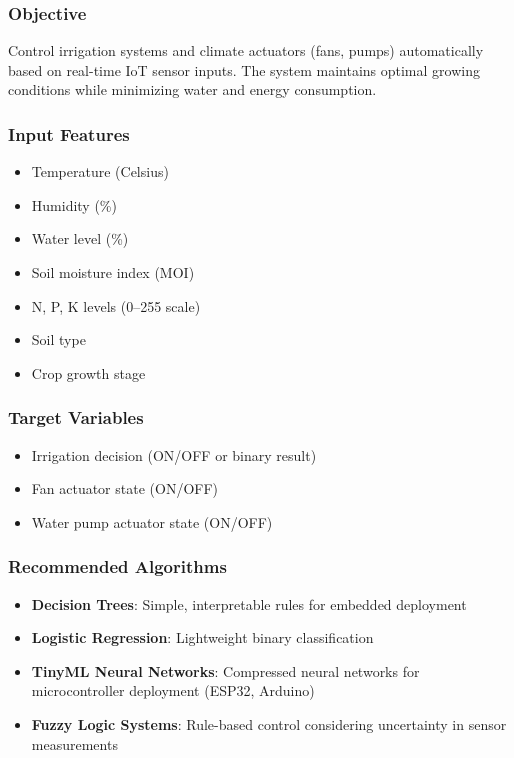 \documentclass[conference]{IEEEtran}
\begin{document}
\subsubsection{Objective}
Control irrigation systems and climate actuators (fans, pumps) automatically based on real-time IoT sensor inputs. The system maintains optimal growing conditions while minimizing water and energy consumption.

\subsubsection{Input Features}
\begin{itemize}
\item Temperature (Celsius)
\item Humidity (\%)
\item Water level (\%)
\item Soil moisture index (MOI)
\item N, P, K levels (0--255 scale)
\item Soil type
\item Crop growth stage
\end{itemize}

\subsubsection{Target Variables}
\begin{itemize}
\item Irrigation decision (ON/OFF or binary result)
\item Fan actuator state (ON/OFF)
\item Water pump actuator state (ON/OFF)
\end{itemize}

\subsubsection{Recommended Algorithms}
\begin{itemize}
\item \textbf{Decision Trees}: Simple, interpretable rules for embedded deployment
\item \textbf{Logistic Regression}: Lightweight binary classification
\item \textbf{TinyML Neural Networks}: Compressed neural networks for microcontroller deployment (ESP32, Arduino)
\item \textbf{Fuzzy Logic Systems}: Rule-based control considering uncertainty in sensor measurements
\end{itemize}
\end{document}
